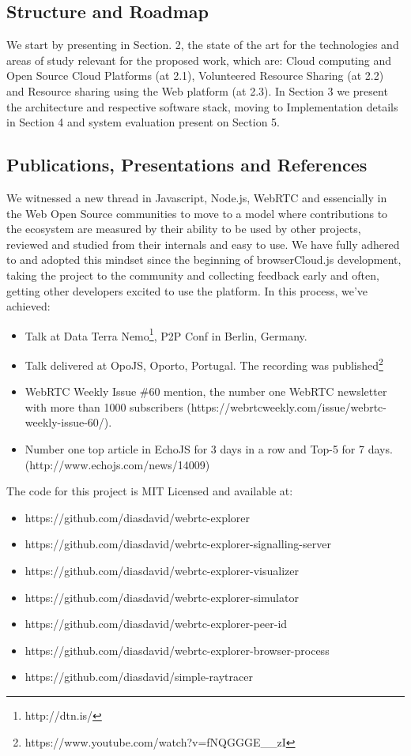 \subsection{Structure and Roadmap}

We start by presenting in Section. 2, the state of the art for the technologies and areas of study relevant for the proposed work, which are: Cloud computing and Open Source Cloud Platforms (at 2.1), Volunteered Resource Sharing (at 2.2) and Resource sharing using the Web platform (at 2.3). In Section 3 we present the architecture and respective software stack, moving to Implementation details in Section 4 and system evaluation present on Section 5.

\subsection{Publications, Presentations and References}

We witnessed a new thread in Javascript, Node.js, WebRTC and essencially in the Web Open Source communities to move to a model where contributions to the ecosystem are measured by their ability to be used by other projects, reviewed and studied from their internals and easy to use. We have fully adhered to and adopted this mindset since the beginning of browserCloud.js development, taking the project to the community and collecting feedback early and often, getting other developers excited to use the platform. In this process, we've achieved:

\begin{itemize}
  \item Talk at Data Terra Nemo\footnote{http://dtn.is/}, P2P Conf in Berlin, Germany.
  \item Talk delivered at OpoJS, Oporto, Portugal. The recording was published\footnote{https://www.youtube.com/watch?v=fNQGGGE\_\_zI}
  \item WebRTC Weekly Issue \#60 mention, the number one WebRTC newsletter with more than 1000 subscribers (https://webrtcweekly.com/issue/webrtc-weekly-issue-60/).
  \item Number one top article in EchoJS for 3 days in a row and Top-5 for 7 days. (http://www.echojs.com/news/14009)
\end{itemize}

The code for this project is MIT Licensed and available at:

\begin{itemize}
  \item https://github.com/diasdavid/webrtc-explorer
  \item https://github.com/diasdavid/webrtc-explorer-signalling-server
  \item https://github.com/diasdavid/webrtc-explorer-visualizer
  \item https://github.com/diasdavid/webrtc-explorer-simulator
  \item https://github.com/diasdavid/webrtc-explorer-peer-id
  \item https://github.com/diasdavid/webrtc-explorer-browser-process
  \item https://github.com/diasdavid/simple-raytracer
\end{itemize}
